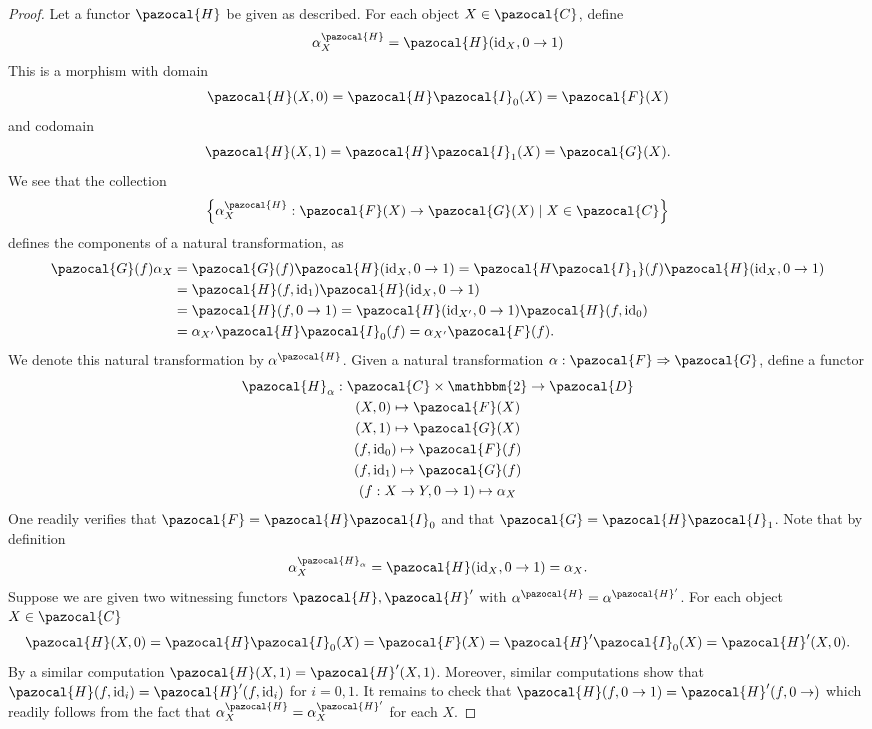     \begin{proof}
        Let a functor $\pazocal{H}$ be given as described. For each object $X\in \pazocal{C}$, define 
        \begin{gather*}
            \alpha_X^\pazocal{H} = \pazocal{H}(\id_X,0\rightarrow 1) 
        \end{gather*}
        This is a morphism with domain 
        $$
            \pazocal{H}(X,0)=\pazocal{H}\pazocal{I}_0(X)=\pazocal{F}(X)
        $$
        and codomain
        $$
            \pazocal{H}(X,1)=\pazocal{H}\pazocal{I}_1(X)=\pazocal{G}(X).
        $$
        We see that the collection 
        $$ 
            \left\{\alpha_X^\pazocal{H} : \pazocal{F}(X)\rightarrow \pazocal{G}(X) \mid X\in \pazocal{C}\right\}
        $$
        defines the components of a natural transformation, as
        \begin{align*}
            \pazocal{G}(f)\alpha_X &= \pazocal{G}(f)\pazocal{H}(\id_X,0\rightarrow 1) = \pazocal{H\pazocal{I}_1}(f)\pazocal{H}(\id_X,0\rightarrow 1)\\
            &= \pazocal{H}(f,\id_1)\pazocal{H}(\id_X,0\rightarrow 1)\\ 
            &= \pazocal{H}(f,0\rightarrow 1) = \pazocal{H}(\id_{X'},0\rightarrow 1)\pazocal{H}(f,\id_0)\\
            &= \alpha_{X'}\pazocal{H}\pazocal{I}_0(f)=\alpha_{X'}\pazocal{F}(f).
        \end{align*}
        We denote this natural transformation by $\alpha^\pazocal{H}$.
        Given a natural transformation $\alpha: \pazocal{F}\Rightarrow \pazocal{G}$, define a functor 
        \begin{gather*} 
            \pazocal{H}_\alpha : \pazocal{C}\times \mathbbm{2}\rightarrow \pazocal{D}\\
            (X,0) \mapsto \pazocal{F}(X)\\
            (X,1)\mapsto \pazocal{G}(X)\\
            (f,\id_0)\mapsto \pazocal{F}(f)\\
            (f,\id_1) \mapsto \pazocal{G}(f)\\
            (f: X\rightarrow Y,0\rightarrow 1) \mapsto \alpha_X 
        \end{gather*}
        One readily verifies that $\pazocal{F}=\pazocal{H}\pazocal{I}_0$ and that $\pazocal{G}=\pazocal{H}\pazocal{I}_1$. Note that by definition
        $$
            \alpha_X^{\pazocal{H}_\alpha} = \pazocal{H}(\id_X,0\rightarrow 1) = \alpha_X.
        $$
        Suppose we are given two witnessing functors $\pazocal{H},\pazocal{H}'$ with $\alpha^\pazocal{H} = \alpha^{\pazocal{H}'}$.
        For each object $X\in \pazocal{C}$
        $$\pazocal{H}(X,0)=\pazocal{H}\pazocal{I}_0(X)=\pazocal{F}(X)=\pazocal{H}'\pazocal{I}_0(X)=\pazocal{H}'(X,0).$$
        By a similar computation $\pazocal{H}(X,1)=\pazocal{H}'(X,1)$. Moreover, similar computations show that $\pazocal{H}(f,\id_i) = \pazocal{H}'(f,\id_i)$ for $i=0,1$. It remains to check that $\pazocal{H}(f,0\rightarrow 1) = \pazocal{H}'(f,0\rightarrow)$ which readily follows from the fact that $\alpha_X^\pazocal{H}=\alpha_X^{\pazocal{H}'}$ for each $X$.
    \end{proof}
